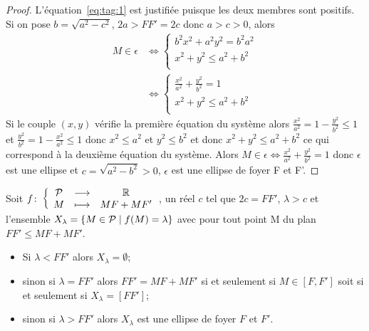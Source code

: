 \begin{proof}
L'équation~\eqref{eq:tag:1} est justifiée puisque les deux membres sont positifs. Si on  pose \(b=\sqrt{a^2-c^2}\), \(2a>FF'=2c\) donc \(a>c>0\), alors
\begin{align}
  M \in \epsilon & \iff \begin{cases} b^2x^2 +a^2y^2=b^2a^2 \\ x^2+y^2 \leqslant a^2 +b^2\\\end{cases}\\
  & \iff \begin{cases} \frac{x^2}{a^2} +\frac{y^2}{b^2}=1\\ x^2+y^2 \leqslant a^2 +b^2 \\\end{cases}
\end{align}
Si le couple \((x,y)\) vérifie la première équation du système alors \(\frac{x^2}{a^2}=1-\frac{y^2}{b^2}\leqslant 1\) et \(\frac{y^2}{b^2}=1-\frac{x^2}{a^2} \leqslant 1\) donc \(x^2 \leqslant a^2\) et \(y^2 \leqslant b^2\) et donc \(x^2+y^2 \leqslant a^2+b^2\) ce qui correspond à la deuxième équation du système.
Alors \(M \in \epsilon \iff \frac{x^2}{a^2} +\frac{y^2}{b^2}=1\) donc \(\epsilon\) est une ellipse et \(c=\sqrt{a^2-b^2}>0\), \(\epsilon\) est une ellipse de foyer F et F'.
\end{proof}
Soit \(f\colon \left\{\begin{array}{ccc} \mathcal{P} & \longrightarrow &\mathbb{R}\\ M & \longmapsto & MF+MF' \end{array} \right.\), un réel \(c\) tel que \(2c=FF'\), \(\lambda>c\) et l'ensemble \(X_\lambda=\left\{M \in \mathcal{P}\mathrel{}\middle|\mathrel{}f(M)=\lambda\right\}\) avec pour tout point M du plan \(FF'\leqslant MF+MF'\).
\begin{itemize}
\item Si \(\lambda < FF'\) alors \(X_\lambda=\emptyset\);
\item sinon si \(\lambda=FF'\) alors \(FF'=MF+MF'\) si et seulement si \(M \in [F,F']\) soit si et seulement si \(X_\lambda=[FF']\);
\item sinon si \(\lambda >FF'\) alors \(X_\lambda\) est une ellipse de foyer \(F\) et \(F'\).
\end{itemize}

